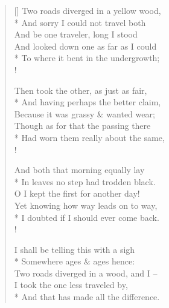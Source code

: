 \documentclass[MAIN]{subfiles}
\begin{document}
\settowidth{\versewidth}{Two roads diverged in a yellow wood,}
\begin{verse}[\versewidth]
Two roads diverged in a yellow wood,\\*
\vin And sorry I could not travel both\\
And be one traveler, long I stood\\
And looked down one as far as I could\\*
\vin To where it bent in the undergrowth;\\!

Then took the other, as just as fair,\\*
\vin And having perhaps the better claim,\\
Because it was grassy \& wanted wear;\\
Though as for that the passing there\\*
\vin Had worn them really about the same,\\!

And both that morning equally lay\\*
\vin In leaves no step had trodden black.\\
O I kept the first for another day!\\
Yet knowing how way leads on to way,\\*
\vin I doubted if I should ever come back.\\!

I shall be telling this with a sigh\\*
\vin Somewhere ages \& ages hence:\\
Two roads diverged in a wood, and I --\\
I took the one less traveled by,\\*
\vin And that has made all the difference.
\end{verse}
\end{document}
